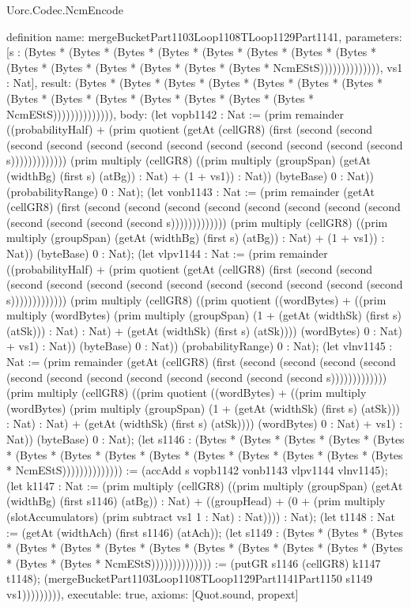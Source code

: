 \begin{lexlean}{Uorc.Codec.NcmEncode}
\begin{semanticmodule}
definition{
  name: mergeBucketPart1103Loop1108TLoop1129Part1141,
  parameters: [s : (Bytes * (Bytes * (Bytes * (Bytes * (Bytes * (Bytes * (Bytes * (Bytes * (Bytes * (Bytes * (Bytes * (Bytes * (Bytes * (Bytes * NcmEStS)))))))))))))), vs1 : Nat],
  result: (Bytes * (Bytes * (Bytes * (Bytes * (Bytes * (Bytes * (Bytes * (Bytes * (Bytes * (Bytes * (Bytes * (Bytes * (Bytes * (Bytes * NcmEStS)))))))))))))),
  body: (let vopb1142 : Nat := (prim remainder ((probabilityHalf) + (prim quotient (getAt (cellGR8) (first (second (second (second (second (second (second (second (second (second (second (second (second s))))))))))))) (prim multiply (cellGR8) ((prim multiply (groupSpan) (getAt (widthBg) (first s) (atBg)) : Nat) + (1 + vs1)) : Nat)) (byteBase) 0 : Nat)) (probabilityRange) 0 : Nat); (let vonb1143 : Nat := (prim remainder (getAt (cellGR8) (first (second (second (second (second (second (second (second (second (second (second (second (second s))))))))))))) (prim multiply (cellGR8) ((prim multiply (groupSpan) (getAt (widthBg) (first s) (atBg)) : Nat) + (1 + vs1)) : Nat)) (byteBase) 0 : Nat); (let vlpv1144 : Nat := (prim remainder ((probabilityHalf) + (prim quotient (getAt (cellGR8) (first (second (second (second (second (second (second (second (second (second (second (second (second s))))))))))))) (prim multiply (cellGR8) ((prim quotient ((wordBytes) + ((prim multiply (wordBytes) (prim multiply (groupSpan) (1 + (getAt (widthSk) (first s) (atSk))) : Nat) : Nat) + (getAt (widthSk) (first s) (atSk)))) (wordBytes) 0 : Nat) + vs1) : Nat)) (byteBase) 0 : Nat)) (probabilityRange) 0 : Nat); (let vlnv1145 : Nat := (prim remainder (getAt (cellGR8) (first (second (second (second (second (second (second (second (second (second (second (second (second s))))))))))))) (prim multiply (cellGR8) ((prim quotient ((wordBytes) + ((prim multiply (wordBytes) (prim multiply (groupSpan) (1 + (getAt (widthSk) (first s) (atSk))) : Nat) : Nat) + (getAt (widthSk) (first s) (atSk)))) (wordBytes) 0 : Nat) + vs1) : Nat)) (byteBase) 0 : Nat); (let s1146 : (Bytes * (Bytes * (Bytes * (Bytes * (Bytes * (Bytes * (Bytes * (Bytes * (Bytes * (Bytes * (Bytes * (Bytes * (Bytes * (Bytes * NcmEStS)))))))))))))) := (accAdd s vopb1142 vonb1143 vlpv1144 vlnv1145); (let k1147 : Nat := (prim multiply (cellGR8) ((prim multiply (groupSpan) (getAt (widthBg) (first s1146) (atBg)) : Nat) + ((groupHead) + (0 + (prim multiply (slotAccumulators) (prim subtract vs1 1 : Nat) : Nat)))) : Nat); (let t1148 : Nat := (getAt (widthAch) (first s1146) (atAch)); (let s1149 : (Bytes * (Bytes * (Bytes * (Bytes * (Bytes * (Bytes * (Bytes * (Bytes * (Bytes * (Bytes * (Bytes * (Bytes * (Bytes * (Bytes * NcmEStS)))))))))))))) := (putGR s1146 (cellGR8) k1147 t1148); (mergeBucketPart1103Loop1108TLoop1129Part1141Part1150 s1149 vs1))))))))),
  executable: true,
  axioms: [Quot.sound, propext]
}


\end{semanticmodule}
\end{lexlean}
